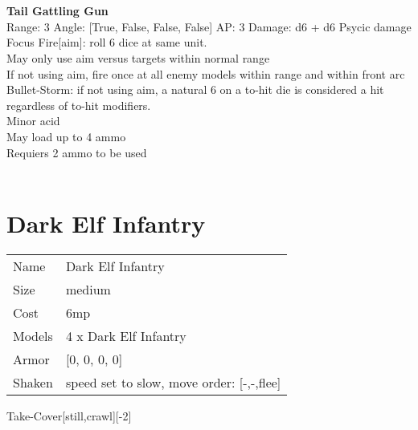 \ \\

\ \\
{\bf Tail Gattling Gun } \\



Range: 3  Angle: [True, False, False, False] AP: 3 Damage: d6 + d6 Psycic damage \\
Focus Fire[aim]: roll 6 dice at same unit.\\ 
May only use aim versus targets within normal range\\ 
If not using aim, fire once at all enemy models within range and within front arc\\ 
Bullet-Storm: if not using aim, a natural 6 on a to-hit die is considered a hit regardless of to-hit modifiers.\\ 
Minor acid\\ 
May load up to 4 ammo\\ 
Requiers 2 ammo to be used\\ 




 
\ \\













\clearpage

\section{ Dark Elf Infantry }

\begin{tabular}{ll}
  Name & Dark Elf Infantry \\
  Size & medium\\
  Cost & 6mp\\
  Models & 4 x Dark Elf Infantry\\
  Armor & [0, 0, 0, 0]\\
  Shaken & speed set to slow, move order: [-,-,flee]\\
\end{tabular}

\noindent Take-Cover[still,crawl][-2]\\ 


